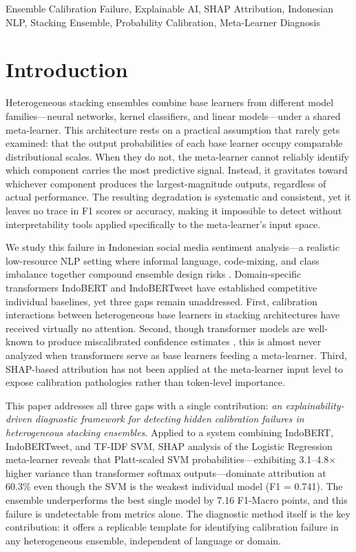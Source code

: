 \documentclass[conference]{IEEEtran}
\begin{document}
\begin{IEEEkeywords}
Ensemble Calibration Failure, Explainable AI, SHAP Attribution, Indonesian NLP, Stacking Ensemble, Probability Calibration, Meta-Learner Diagnosis
\end{IEEEkeywords}

\section{Introduction}

Heterogeneous stacking ensembles combine base learners from different model families---neural networks, kernel classifiers, and linear models---under a shared meta-learner. This architecture rests on a practical assumption that rarely gets examined: that the output probabilities of each base learner occupy comparable distributional scales. When they do not, the meta-learner cannot reliably identify which component carries the most predictive signal. Instead, it gravitates toward whichever component produces the largest-magnitude outputs, regardless of actual performance. The resulting degradation is systematic and consistent, yet it leaves no trace in F1 scores or accuracy, making it impossible to detect without interpretability tools applied specifically to the meta-learner's input space.

We study this failure in Indonesian social media sentiment analysis---a realistic low-resource NLP setting \cite{b25} where informal language, code-mixing, and class imbalance together compound ensemble design risks \cite{b2,b5}. Domain-specific transformers IndoBERT \cite{b3} and IndoBERTweet \cite{b4} have established competitive individual baselines, yet three gaps remain unaddressed. First, calibration interactions between heterogeneous base learners in stacking architectures have received virtually no attention. Second, though transformer models are well-known to produce miscalibrated confidence estimates \cite{b15}, this is almost never analyzed when transformers serve as base learners feeding a meta-learner. Third, SHAP-based attribution has not been applied at the meta-learner input level to expose calibration pathologies rather than token-level importance.

This paper addresses all three gaps with a single contribution: \textit{an explainability-driven diagnostic framework for detecting hidden calibration failures in heterogeneous stacking ensembles}. Applied to a system combining IndoBERT, IndoBERTweet, and TF-IDF SVM, SHAP analysis of the Logistic Regression meta-learner reveals that Platt-scaled SVM probabilities---exhibiting 3.1--4.8$\times$ higher variance than transformer softmax outputs---dominate attribution at 60.3\% even though the SVM is the weakest individual model (F1 = 0.741). The ensemble underperforms the best single model by 7.16 F1-Macro points, and this failure is undetectable from metrics alone. The diagnostic method itself is the key contribution: it offers a replicable template for identifying calibration failure in any heterogeneous ensemble, independent of language or domain.
\end{document}
